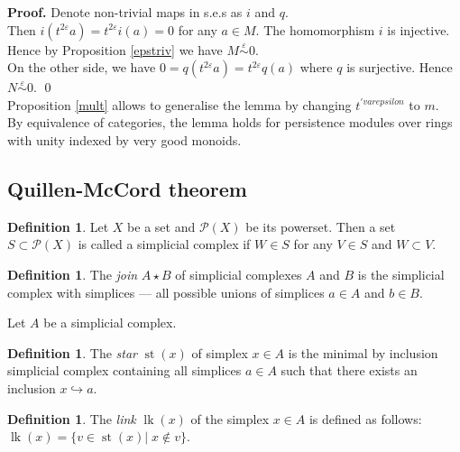 \documentclass[english,12pt]{article}
\newcounter{stmcounter}[section]
\numberwithin{equation}{section}
\theoremstyle{definition}
\newtheorem{definition}[stmcounter]{Definition}
\theoremstyle{remark}
\newenvironment{pf}{\noindent\textbf{Proof.}}{\qed}
\newcommand{\define}[1]{{\textit{#1}}}
\begin{document}
\begin{pf}
  Denote non-trivial maps in s.e.s as $i$ and $q$.\\

  Then $i(t^{2\varepsilon}a) = t^{2\varepsilon}i(a) = 0$ for any $a \in M$. The homomorphism $i$ is injective. Hence by Proposition \ref{epstriv} we have $M \stackrel{\varepsilon}{\sim} 0$.\\

  On the other side, we have $0 = q(t^{2\varepsilon}a) = t^{2\varepsilon}q(a)$ where $q$ is surjective. Hence $N \stackrel{\varepsilon}{\sim} 0$.
\end{pf}\\

Proposition \ref{mult} allows to generalise the lemma by changing $t^{'varepsilon}$ to $m$.\\

By equivalence of categories, the lemma holds for persistence modules over rings with unity indexed by very good monoids.

\subsection{Quillen-McCord theorem}

\begin{definition}
  Let $X$ be a set and $\mathcal{P}(X)$ be its powerset. Then a set $S \subset \mathcal{P}(X)$ is called a simplicial complex if $W \in S$ for any $V \in S$ and $W \subset V$.
\end{definition}

\begin{definition}
  The \define{join} $A \star B$ of simplicial complexes $A$ and $B$ is the simplicial complex with simplices --- all possible unions of simplices $a \in A$ and $b \in B$.
\end{definition}

Let $A$ be a simplicial complex.

\begin{definition}
  The \define{star} $\operatorname{st}(x)$ of simplex $x \in A$ is the minimal by inclusion simplicial complex containing all simplices $a \in A$ such that there exists an inclusion $x \hookrightarrow a$.
\end{definition}

\begin{definition}
  The \define{link} $\operatorname{lk}(x)$ of the simplex $x \in A$ is defined as follows: $\operatorname{lk}(x) = \{v \in \operatorname{st}(x)|\; x \not\in v\}$.
\end{definition}
\end{document}
